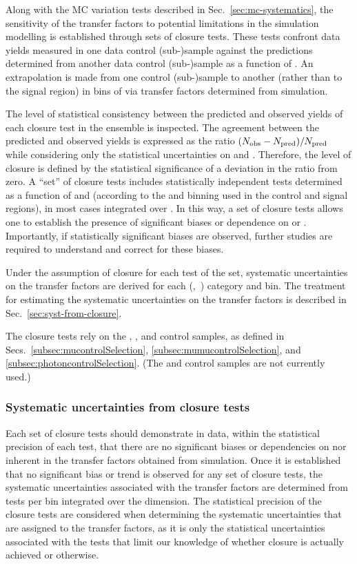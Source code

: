 Along with the MC variation tests described in Sec.~\ref{sec:mc-systematics}, 
the sensitivity of the transfer factors to potential limitations in
the simulation modelling is established through sets of closure tests.
These tests confront data yields measured in one data control (sub-)sample
against the predictions determined from another data control
(sub-)sample as a function of \scalht. An extrapolation is made
from one control (sub-)sample to another (rather than to the signal
region) in bins of \scalht via transfer factors determined from
simulation. 

The level of statistical consistency between the predicted and
observed yields of each closure test in the ensemble is inspected. The
agreement between the predicted and observed yields is
expressed as the ratio $(\nobs - \npre)/\npre$ while considering only
the statistical uncertainties on \npre and \nobs. Therefore, the level
of closure is defined by the statistical significance of a deviation
in the ratio from zero. A ``set'' of closure tests includes
statistically independent tests determined as a function of \scalht
and \njet (according to the \scalht and \njet binning used in the control and signal
regions), in most cases integrated over \nb. In this way, a set of closure 
tests allows one to establish
the presence of significant biases or dependence on
\scalht or \njet. Importantly, if statistically significant biases are
observed, further studies are required to understand and correct for
these biases. 

Under the assumption of closure for each test of the set,
systematic uncertainties on the transfer factors are derived for each
(\njet,~\nb) category and \scalht bin. The treatment for estimating
the systematic uncertainties on the transfer factors is described in
Sec.~\ref{sec:syst-from-closure}.

The closure tests rely on the \mj, \mmj, and \gj control samples,
as defined in Secs.~\ref{subsec:mucontrolSelection},
\ref{subsec:mumucontrolSelection}, and
\ref{subsec:photoncontrolSelection}. (The \ej and \eej control samples
are not currently used.)

\subsubsection{Systematic uncertainties from closure tests\label{sec:syst-from-closure}}

Each set of closure tests should demonstrate in data, within the
statistical precision of each test, that there are no significant
biases or dependencies on \njet nor \scalht inherent in the transfer
factors obtained from simulation. 
Once it is established that no significant bias or trend is observed
for any set of closure tests, the systematic uncertainties associated
with the transfer factors are determined from tests per \scalht bin
integrated over the \njet dimension. The statistical precision of the 
closure tests are considered
when determining the systematic uncertainties that are assigned to the
transfer factors, as it is only the statistical uncertainties
associated with the tests that limit our knowledge of whether closure
is actually achieved or otherwise. 

